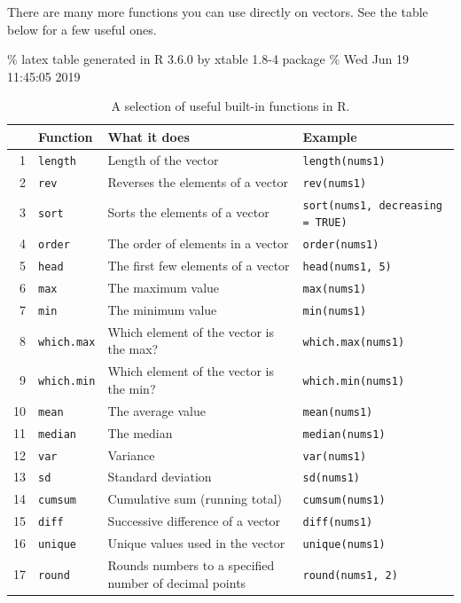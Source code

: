 \documentclass[]{book}
\begin{document}
There are many more functions you can use directly on vectors. See the table below for a few useful ones.

\% latex table generated in R 3.6.0 by xtable 1.8-4 package
\% Wed Jun 19 11:45:05 2019

\begin{table}[ht]
\centering
\begin{tabular}{rlll}
  \hline
 & Function & What it does & Example \\ 
  \hline
1 & \texttt{length} & Length of the vector & \texttt{length(nums1)} \\ 
  2 & \texttt{rev} & Reverses the elements of a vector & \texttt{rev(nums1)} \\ 
  3 & \texttt{sort} & Sorts the elements of a vector & \texttt{sort(nums1, decreasing = TRUE)} \\ 
  4 & \texttt{order} & The order of elements in a vector & \texttt{order(nums1)} \\ 
  5 & \texttt{head} & The first few elements of a vector & \texttt{head(nums1, 5)} \\ 
  6 & \texttt{max} & The maximum value & \texttt{max(nums1)} \\ 
  7 & \texttt{min} & The minimum value & \texttt{min(nums1)} \\ 
  8 & \texttt{which.max} & Which element of the vector is the max? & \texttt{which.max(nums1)} \\ 
  9 & \texttt{which.min} & Which element of the vector is the min? & \texttt{which.min(nums1)} \\ 
  10 & \texttt{mean} & The average value & \texttt{mean(nums1)} \\ 
  11 & \texttt{median} & The median & \texttt{median(nums1)} \\ 
  12 & \texttt{var} & Variance & \texttt{var(nums1)} \\ 
  13 & \texttt{sd} & Standard deviation & \texttt{sd(nums1)} \\ 
  14 & \texttt{cumsum} & Cumulative sum (running total) & \texttt{cumsum(nums1)} \\ 
  15 & \texttt{diff} & Successive difference of a vector & \texttt{diff(nums1)} \\ 
  16 & \texttt{unique} & Unique values used in the vector & \texttt{unique(nums1)} \\ 
  17 & \texttt{round} & Rounds numbers to a specified number of decimal points & \texttt{round(nums1, 2)} \\ 
   \hline
\end{tabular}
\caption{A selection of useful built-in functions in R.} 
\end{table}
\end{document}
